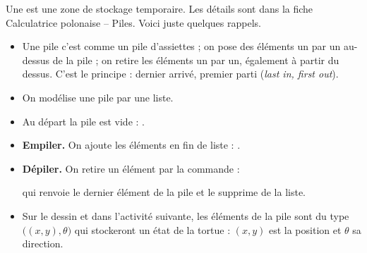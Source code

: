 \documentclass[11pt,class=report,crop=false]{standalone}
\begin{document}
\begin{cours}[Piles]
Une  est une zone de stockage temporaire. Les détails sont dans la fiche \og{}Calculatrice polonaise -- Piles\fg{}. Voici juste quelques rappels.



\begin{itemize}
  \item Une pile c'est comme un pile d'assiettes ; on pose des éléments un par un au-dessus de la pile ; on retire les éléments un par un, également à partir du dessus. C'est le principe : \og{}dernier arrivé, premier parti\fg{} (\emph{last in, first out}).
  
  \item On modélise une pile par une liste. 
  \item Au départ la pile est vide : .
  \item \textbf{Empiler.} On ajoute les éléments en fin de liste : .
  \item \textbf{Dépiler.} On retire un élément par la commande  :\\
  \centerline{}
  qui renvoie le dernier élément de la pile et le supprime de la liste.
  
  \item Sur le dessin et dans l'activité suivante, les éléments de la pile sont du type $\big((x,y),\theta\big)$  qui stockeront un état de la tortue : $(x,y)$ est la position et $\theta$ sa direction.
  
\end{itemize}

\end{cours}


\end{document}
